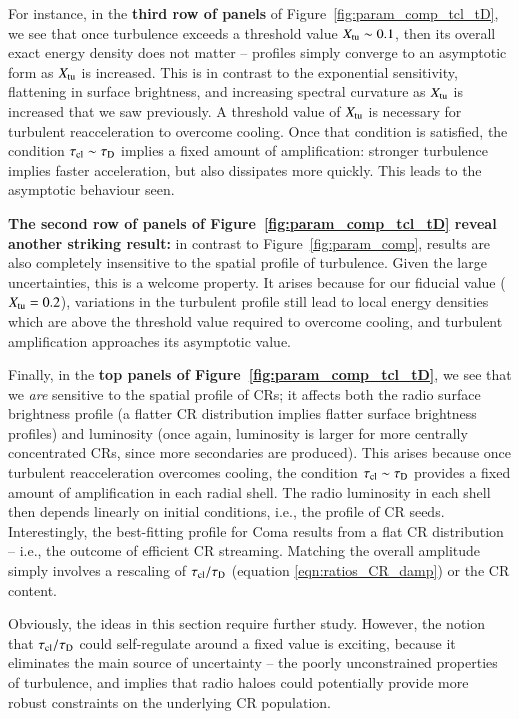 \documentclass[fleqn,usenatbib,useAMS]{mnras}
\newcommand\C[1]{{\bf #1}}
\begin{document}
For instance, in the \C{third row of panels} of
Figure~\ref{fig:param_comp_tcl_tD}, we see that once turbulence exceeds a
threshold value $X_{\rm tu} \sim 0.1$, then its overall exact energy density
does not matter -- profiles simply converge to an asymptotic form as $X_{\rm
  tu}$ is increased. This is in contrast to the exponential sensitivity,
flattening in surface brightness, and increasing spectral curvature as $X_{\rm
  tu}$ is increased that we saw previously. A threshold value of $X_{\rm tu}$ is
necessary for turbulent reacceleration to overcome cooling. Once that condition
is satisfied, the condition $\tau_{\rm cl} \sim \tau_{\rm D}$ implies a fixed
amount of amplification: stronger turbulence implies faster acceleration, but
also dissipates more quickly. This leads to the asymptotic behaviour seen.

\C{The second row of panels of Figure~\ref{fig:param_comp_tcl_tD} reveal another
  striking result:} in contrast to Figure~\ref{fig:param_comp}, results are also
completely insensitive to the spatial profile of turbulence. Given the large
uncertainties, this is a welcome property. It arises because for our fiducial
value ($X_{\rm tu} = 0.2$), variations in the turbulent profile still lead to
local energy densities which are above the threshold value required to overcome
cooling, and turbulent amplification approaches its asymptotic value.

Finally, in the \C{top panels of Figure~\ref{fig:param_comp_tcl_tD}}, we see
that we {\it are} sensitive to the spatial profile of CRs; it affects both the
radio surface brightness profile (a flatter CR distribution implies flatter
surface brightness profiles) and luminosity (once again, luminosity is larger
for more centrally concentrated CRs, since more secondaries are produced). This
arises because once turbulent reacceleration overcomes cooling, the condition
$\tau_{\rm cl} \sim \tau_{\rm D}$ provides a fixed amount of amplification in
each radial shell. The radio luminosity in each shell then depends linearly on
initial conditions, i.e., the profile of CR seeds. Interestingly, the
best-fitting profile for Coma results from a flat CR distribution -- i.e., the
outcome of efficient CR streaming. Matching the overall amplitude simply
involves a rescaling of $\tau_{\rm cl}/\tau_{\rm D}$ (equation
\ref{eqn:ratios_CR_damp}) or the CR content.

Obviously, the ideas in this section require further study. However, the notion that $\tau_{\rm cl}/\tau_{\rm D}$ could self-regulate around a fixed value is exciting, because it eliminates the main source of uncertainty -- the poorly unconstrained properties of turbulence, and implies that radio haloes could potentially provide more robust constraints on the underlying CR population.  
\end{document}
